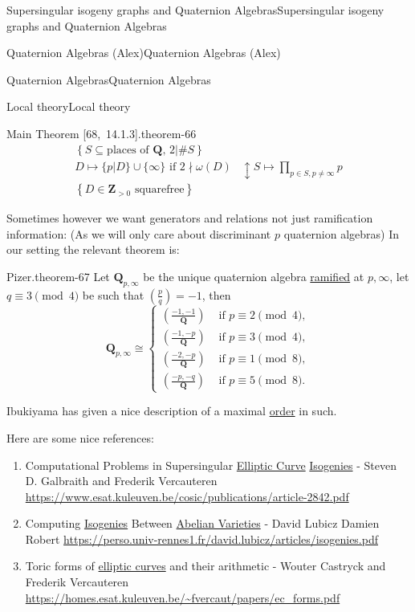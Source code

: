 \documentclass[10pt,]{book}
\numberwithin{equation}{section}
\newcommand{\legendre}[2]{\left(\frac{#1}{#2}\right)}
\newcommand{\ZZ}{\mathbf{Z}}
\newcommand{\QQ}{\mathbf{Q}}
\newcommand{\gt}{>}
\newcommand{\amp}{&}
\begin{document}
\begin{chapterptx}{Supersingular isogeny graphs and Quaternion Algebras}{}{Supersingular isogeny graphs and Quaternion Algebras}{}{}
\begin{sectionptx}{Quaternion Algebras (Alex)}{}{Quaternion Algebras (Alex)}{}{}
\begin{subsectionptx}{Quaternion Algebras}{}{Quaternion Algebras}{}{}
\begin{subsubsectionptx}{Local theory}{}{Local theory}{}{}
\begin{theorem}{Main Theorem [68,~14.1.3].}{}{theorem-66}
\begin{align*}
\left\{ S \subseteq \text{places of }\QQ,\,2|\#S \right\}\\
D \mapsto \{p|D\} \cup \{\infty\} \text{ if }2\nmid \omega(D)\amp\updownarrow S \mapsto \prod_{p\in S,p\ne \infty} p\\
\left\{ D\in \ZZ_{\gt 0 }\text{ squarefree}\right\}
\end{align*}
%
\end{theorem}
\hypertarget{p-932}{}%
Sometimes however we want generators and relations not just ramification information: (As we will only care about discriminant \(p\) quaternion algebras) In our setting the relevant theorem is:%
\begin{theorem}{Pizer.}{}{theorem-67}%
\hypertarget{p-933}{}%
Let \(\QQ_{p,\infty}\) be the unique quaternion algebra \hyperref[def-dess-ramified]{ramified} at \(p,\infty\), let \(q \equiv 3 \pmod 4\) be such that \(\legendre pq = -1\), then%
\begin{equation*}
\QQ_{p,\infty} \cong
\begin{cases}
\legendre{-1,-1}{\QQ} \amp \text{ if }p\equiv 2\pmod 4,\\
\legendre{-1,-p}{\QQ} \amp \text{ if }p\equiv 3\pmod 4,\\
\legendre{-2,-p}{\QQ} \amp \text{ if }p\equiv 1\pmod 8,\\
\legendre{-p,-q}{\QQ} \amp \text{ if }p\equiv 5\pmod 8.
\end{cases}
\end{equation*}
%
\end{theorem}
\hypertarget{p-934}{}%
Ibukiyama has given a nice description of a maximal \hyperref[def-order-quaternion]{order} in such.%
\par
\hypertarget{p-935}{}%
Here are some nice references:\leavevmode%
\begin{enumerate}
\item\hypertarget{li-227}{}Computational Problems in Supersingular \hyperref[def-supersing-isog-ec]{Elliptic Curve} \hyperref[def-supersing-isog-isog]{Isogenies} - Steven D. Galbraith and Frederik Vercauteren \url{https://www.esat.kuleuven.be/cosic/publications/article-2842.pdf}%
\item\hypertarget{li-228}{}Computing \hyperref[def-supersing-isog-isog]{Isogenies} Between \hyperref[def-buntes-abvar]{Abelian Varieties} - David Lubicz Damien Robert \url{https://perso.univ-rennes1.fr/david.lubicz/articles/isogenies.pdf}%
\item\hypertarget{li-229}{}Toric forms of \hyperref[def-supersing-isog-ec]{elliptic curves} and their arithmetic - Wouter Castryck and Frederik Vercauteren \url{https://homes.esat.kuleuven.be/\~fvercaut/papers/ec_forms.pdf}%

\end{enumerate}
\end{subsubsectionptx}
\end{subsectionptx}
\end{sectionptx}
\end{chapterptx}
\end{document}
